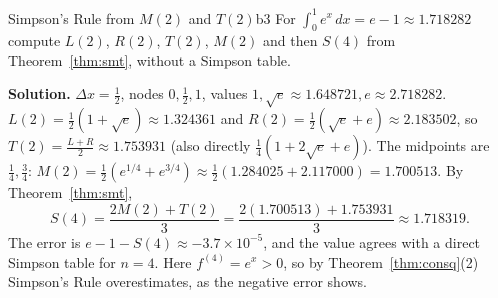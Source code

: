 \documentclass[11pt]{article}
\begin{document}
\begin{exmp}{Simpson's Rule from $M(2)$ and $T(2)$}{b3}
For $\int_0^1e^x\,dx=e-1\approx1.718282$ compute $L(2)$, $R(2)$, $T(2)$, $M(2)$ and then $S(4)$ from Theorem~\ref{thm:smt}, without a Simpson table.

\textbf{Solution.} $\Delta x=\frac12$, nodes $0,\frac12,1$, values $1,\sqrt e\approx1.648721,e\approx2.718282$. $L(2)=\frac12(1+\sqrt e)\approx1.324361$ and $R(2)=\frac12(\sqrt e+e)\approx2.183502$, so $T(2)=\frac{L+R}2\approx1.753931$ (also directly $\frac14(1+2\sqrt e+e)$). The midpoints are $\frac14,\frac34$: $M(2)=\frac12\left(e^{1/4}+e^{3/4}\right)\approx\frac12(1.284025+2.117000)=1.700513$. By Theorem~\ref{thm:smt},
\[S(4)=\frac{2M(2)+T(2)}3=\frac{2(1.700513)+1.753931}3\approx1.718319 .\]
The error is $e-1-S(4)\approx-3.7\times10^{-5}$, and the value agrees with a direct Simpson table for $n=4$. Here $f^{(4)}=e^x>0$, so by Theorem~\ref{thm:consq}(2) Simpson's Rule overestimates, as the negative error shows.
\end{exmp}
\end{document}
